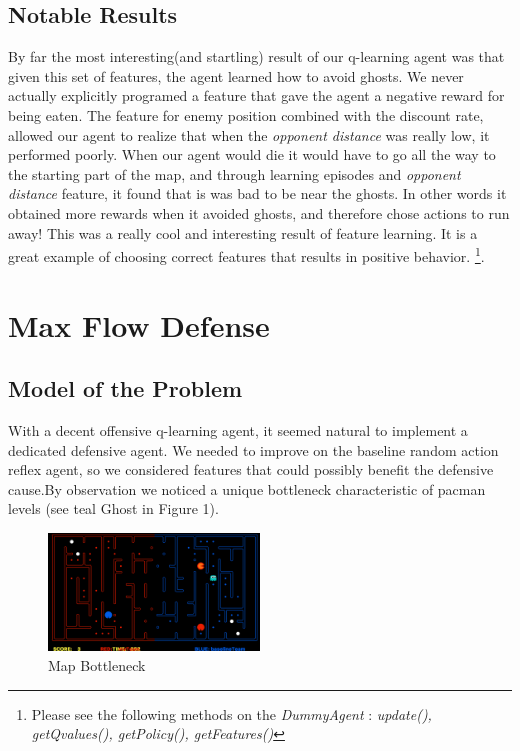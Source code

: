 \documentclass[11pt]{article}
\begin{document}
\subsection{Notable Results}
By far the most interesting(and startling) result of our q-learning agent was that
given this set of features, the agent learned how to avoid ghosts. We never actually
explicitly programed a feature that gave the agent a negative reward for being eaten.
The feature for enemy position combined with the discount rate, allowed our agent to
realize that when the \textit{opponent distance} was really low, it performed poorly.
When our agent would die it would have to go all the way to the starting part of the map, and through
learning episodes and \textit{opponent distance} feature, it found that is was bad to be
near the ghosts. In other words it obtained more rewards when it avoided
ghosts, and therefore chose actions to run away!
This was a really cool and interesting result of feature learning. It is a great example of
choosing correct features that results in positive behavior.
\footnote{Please see the following methods on the \textit{DummyAgent} : \textit{update(), getQvalues(),
getPolicy(), getFeatures()} }.

\section{Max Flow Defense}

\subsection{Model of the Problem}
With a decent offensive q-learning agent, it seemed natural to implement
a dedicated defensive agent. We needed to improve on the baseline random
action reflex agent, so we considered features that could possibly benefit
the defensive cause.By observation we noticed a unique bottleneck characteristic of
pacman levels (see teal Ghost in Figure 1).

\begin{figure}
\centering
\includegraphics[width=0.5\textwidth]{report_fig1.png}
\caption{\label{fig:1}Map Bottleneck}
\end{figure}
\end{document}
